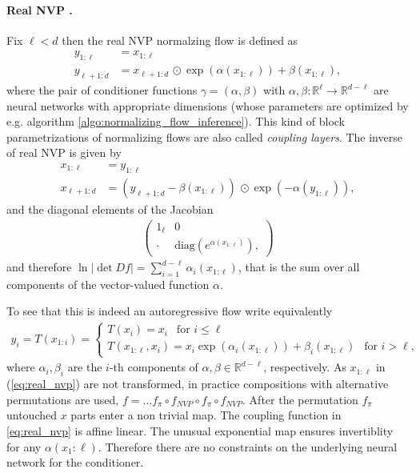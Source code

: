 \documentclass[12pt,a4paper]{article}
\begin{document}
\paragraph{Real NVP \cite{dinh_2016_real_nvp}.} Fix $\ell < d$ then the real NVP normalzing flow is defined as
\begin{align} \label{eq:real_nvp}
	y_{1:\ell} &= x_{1:\ell} \nonumber \\
	y_{\ell+1:d} &= x_{\ell + 1 : d}\, \odot \exp(\alpha(x_{1:\ell})) + \beta(x_{1:\ell}), 
\end{align}
where the pair of conditioner functions $\gamma=(\alpha,\beta)$ with $\alpha, \beta: \mathbb{R}^\ell \rightarrow \mathbb{R}^{d - \ell} $ are neural networks with appropriate dimensions (whose parameters are optimized by e.g. algorithm \ref{algo:normalizing_flow_inference}). This kind of block parametrizations of normalizing flows are also called \textit{coupling layers}. 
The inverse of real NVP is given by
\begin{align} \label{eq:real_nvp}
x_{1:\ell} &= y_{1:\ell} \nonumber \\
x_{\ell+1:d} &= \left(y_{\ell + 1 : d}-  \beta(x_{1:\ell}) \right)\, \odot \exp(-\alpha(y_{1:\ell})), 
\end{align}
and the diagonal elements of the Jacobian 
\begin{align}
\begin{pmatrix}
1_\ell & 0 \\
\cdot & \text{diag} \left(e^{\alpha(x_{1:\ell})}\right),
\end{pmatrix}
\end{align}
and therefore $\ln |\det Df| = \sum_{i=1}^{d-\ell}  \alpha_i(x_{1:\ell})$, that is the sum over all components of the vector-valued function $\alpha$.

To see that this is indeed an  autoregressive flow write equivalently
\begin{align}
	y_i = T(x_{1:i}) = \begin{cases}
	T(x_i) = x_i  ~~ \text{ for } i\leq \ell\\ 
	T(x_{1:\ell}, x_i) =  x_i \exp(\alpha_i(x_{1:\ell})) + \beta_i(x_{1:\ell}) ~~ \text{ for } i > \ell,
	\end{cases}
\end{align}
where $\alpha_i, \beta_i$ are the $i$-th components of $\alpha, \beta \in \mathbb{R}^{d-\ell}$, respectively.
As $x_{1:\ell}$ in (\ref{eq:real_nvp}) are not transformed, in practice compositions with alternative permutations are used, $f = \dots f_\pi \circ  f_{NVP} \circ f_\pi \circ f_{NVP} $. After the permutation $f_\pi$ untouched $x$ parts enter a non trivial map. The coupling function in \ref{eq:real_nvp} is affine linear. The unusual exponential map ensures invertiblity for any $\alpha(x_1:\ell)$. Therefore there are no constraints on the underlying neural network for the conditioner. 
\end{document}
